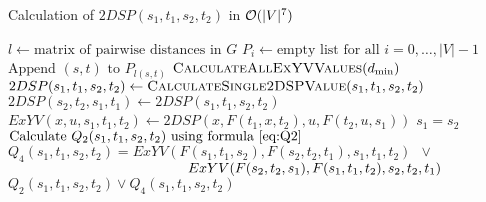 \begin{algorithm}
\caption{Calculation of $2DSP(s_1, t_1, s_2, t_2)$ in $\mathcal{O}(|V|^7)$}
\begin{algorithmic}[1]
\State $l \gets \text{matrix of pairwise distances in }G$
\State $P_i \gets \text{empty list for all }i = 0, \ldots, |V|-1$
    \State $\text{Append }(s, t)\text{ to }P_{l(s, t)}$
\EndFor
{}
    \State $\textsc{CalculateAllExYVValues}(d_{\min})$
                \State $2DSP(s_1, t_1, s_2, t_2) \gets \textsc{CalculateSingle2DSPValue}(s_1, t_1, s_2, t_2)$
                \State $2DSP(s_2, t_2, s_1, t_1) \gets 2DSP(s_1, t_1, s_2, t_2)$ 
            \EndFor
        \EndFor
    \EndFor
\EndFor
\EndProcedure
\Statex
{}
                \State $ExYV(x,u,s_1,t_1,t_2) \gets 2DSP(x, F(t_1,x,t_2), u, F(t_2,u,s_1))$
            \EndFor
        \EndFor
    \EndFor
\EndProcedure
\Statex
{}
    \State \Return $s_1 = s_2$ 
    \State {}
\Else
    \State $\text{Calculate }Q_2(s_1, t_1, s_2, t_2)\text{ using formula \eqref{eq:Q2}}$ 
    \State $Q_4(s_1, t_1, s_2, t_2) = ExYV(F(s_1, t_1, s_2), F(s_2, t_2, t_1), s_1, t_1, t_2)\enspace\vee\enspace$ 
    \Statex $\hspace{4.5cm}ExYV(F(s_2, t_2, s_1), F(s_1, t_1, t_2), s_2, t_2, t_1)$
    \State \Return $Q_2(s_1, t_1, s_2, t_2) \vee Q_4(s_1, t_1, s_2, t_2)$
\EndIf
\EndProcedure
\end{algorithmic}
\end{algorithm}


